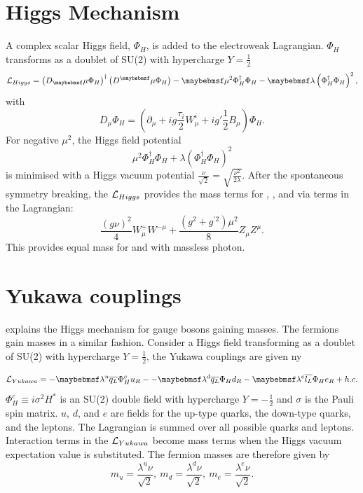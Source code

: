 \section{Higgs Mechanism}
\label{sec:theoryHiggs}
A complex  scalar Higgs field, $\Phi_H$, is added to the electroweak Lagrangian. $\Phi_H$ transforms as a doublet of SU(2) with hypercharge $Y = \frac{1}{2}$
\begin{equation}
\Lagr_{Higgs} = \left(D_\mu\Phi_H\right)^\dagger\left(D^\mu\Phi_H\right) - \mu^2\Phi_H^\dagger\Phi_H - \lambda\left(\Phi_H^\dagger\Phi_H\right)^2,
\end{equation}
with
\begin{equation}
D_\mu\Phi_H = \left(\partial_{\mu} + ig\frac{\tau_i}{2}W^i_{\mu} + ig'\frac{1}{2}B_{\mu}\right)\Phi_H.
\end{equation}
For negative $\mu^2$, the Higgs field potential
\begin{equation}
\mu^2\Phi_H^\dagger\Phi_H + \lambda\left(\Phi_H^\dagger\Phi_H\right)^2
\end{equation}
is minimised with a Higgs vacuum potential $\frac{\nu}{\sqrt{2}}=\sqrt{\frac{\nu^2}{2\lambda}} $. After the spontaneous symmetry breaking, the $\operatorname{\mathcal{L}}_{Higgs}$ provides  the mass terms for \PWp, \PWm, \PZ and \Pgamma via terms in the Lagrangian:
\begin{equation}
\frac{{\left(g\nu\right)}^2}{4}W^+_{\mu}W^{-\mu} + \frac{\left(g^2 + g^{'2}\right)\mu^2}{8}Z_{\mu}Z^{\mu}.
\label{eq:theoryBoson}
\end{equation}
This provides equal mass for \PWp and \PWm with massless photon.

\section{Yukawa couplings}

 explains the Higgs mechanism for gauge bosons gaining masses. The fermions gain masses in a similar fashion. Consider a Higgs field transforming as a doublet of SU(2) with hypercharge $Y = \frac{1}{2}$, the Yukawa couplings are given ny

\begin{equation}
\Lagr_{Yukawa} = -\lambda^{u}\overline{q_L}\Phi_H^{c}u_R - -\lambda^{d}\overline{q_L}\Phi_H{d}_R - \lambda^{e}\overline{l_L}\Phi_{H}e_R + h.c.
\end{equation}
$\Phi_H^{c} \equiv i \sigma^2H^*$ is an SU(2) double field with hypercharge $Y = -\frac{1}{2}$ and $\sigma$ is the Pauli spin matrix. $u$, $d$, and $e$ are fields for the up-type quarks, the down-type quarks, and the leptons. The Lagrangian is summed over all possible quarks and leptons. Interaction terms in the $\operatorname{\mathcal{L}}_{Yukawa}$ become mass terms when the Higgs vacuum expectation value is substituted. The fermion masses are therefore given by
\begin{equation}
m_{u} = \frac{\lambda^u{\nu}}{\sqrt{2}},\ m_{d} = \frac{\lambda^d{\nu}}{\sqrt{2}},\ m_{e} = \frac{\lambda^e{\nu}}{\sqrt{2}}.
\end{equation}

